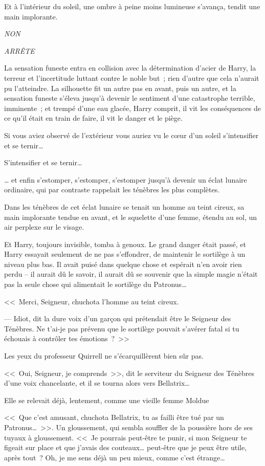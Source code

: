 Et à l'intérieur du soleil, une ombre à peine moins lumineuse s'avança, tendit une main implorante.

\emph{NON}

\emph{ARRÊTE}

La sensation funeste entra en collision avec la détermination d'acier de Harry, la terreur et l'incertitude luttant contre le noble but~; rien d'autre que cela n'aurait pu l'atteindre. La silhouette fit un autre pas en avant, puis un autre, et la sensation funeste s'éleva jusqu'à devenir le sentiment d'une catastrophe terrible, imminente~; et trempé d'une eau glacée, Harry comprit, il vit les conséquences de ce qu'il était en train de faire, il vit le danger et le piège.

Si vous aviez observé de l'extérieur vous auriez vu le cœur d'un soleil s'intensifier et se ternir…

S'intensifier et se ternir…

… et enfin s'estomper, s'estomper, s'estomper jusqu'à devenir un éclat lunaire ordinaire, qui par contraste rappelait les ténèbres les plus complètes.

Dans les ténèbres de cet éclat lunaire se tenait un homme au teint cireux, sa main implorante tendue en avant, et le squelette d'une femme, étendu au sol, un air perplexe sur le visage.

Et Harry, toujours invisible, tomba à genoux. Le grand danger était passé, et Harry essayait seulement de ne pas s'effondrer, de maintenir le sortilège à un niveau plus bas. Il avait puisé dans quelque chose et espérait n'en avoir rien perdu -- il aurait dû le savoir, il aurait dû se souvenir que la simple magie n'était pas la seule chose qui alimentait le sortilège du Patronus…

<<~Merci, Seigneur, chuchota l'homme au teint cireux.

--- Idiot, dit la dure voix d'un garçon qui prétendait être le Seigneur des Ténèbres. Ne t'ai-je pas prévenu que le sortilège pouvait s'avérer fatal si tu échouais à contrôler tes émotions~?~>>

Les yeux du professeur Quirrell ne s'écarquillèrent bien sûr pas.

<<~Oui, Seigneur, je comprends~>>, dit le serviteur du Seigneur des Ténèbres d'une voix chancelante, et il se tourna alors vers Bellatrix…

Elle se relevait déjà, lentement, comme une vieille femme Moldue

 <<~Que c'est amusant, chuchota Bellatrix, tu as failli être tué par un Patronus…~>>. Un gloussement, qui sembla souffler de la poussière hors de ses tuyaux à gloussement. <<~Je pourrais peut-être te punir, si mon Seigneur te figeait sur place et que j'avais des couteaux… peut-être que je peux être utile, après tout~? Oh, je me sens déjà un peu mieux, comme c'est étrange…

